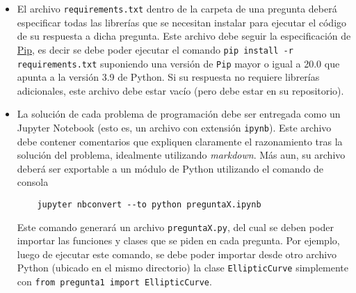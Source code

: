 \begin{itemize}

  \item El archivo \texttt{requirements.txt} dentro de la carpeta de una pregunta deberá especificar todas las librerías que se necesitan instalar para ejecutar el código de su respuesta a dicha pregunta. Este archivo debe seguir la especificación de \href{https://pypi.org/project/pip/}{Pip}, es decir se debe poder ejecutar el comando \texttt{pip install -r requirements.txt} suponiendo una versión de \texttt{Pip} mayor o igual a 20.0 que apunta a la versión 3.9 de Python. Si su respuesta no requiere librerías adicionales, este archivo debe estar vacío (pero debe estar en su repositorio).

\item La solución de cada problema de programación debe ser entregada como un Jupyter Notebook (esto es, un archivo con extensión \texttt{ipynb}). Este archivo debe contener comentarios que expliquen claramente el razonamiento tras la solución del problema, idealmente utilizando \emph{markdown}. Más aun, su archivo deberá ser exportable a un módulo de Python utilizando el comando de consola
\begin{verbatim}
    jupyter nbconvert --to python preguntaX.ipynb
\end{verbatim}
Este comando generará un archivo \texttt{preguntaX.py}, del cual se deben poder importar las funciones y clases que se piden en cada pregunta. Por ejemplo, luego de ejecutar este comando, se debe poder importar desde otro archivo Python (ubicado en el mismo directorio) la clase \texttt{EllipticCurve} simplemente con \texttt{from pregunta1 import EllipticCurve}.


\end{itemize}
